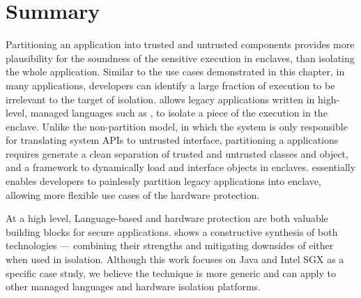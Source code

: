 \section{Summary}
\label{sec:civet:summary}

Partitioning an application into trusted and untrusted components
provides more plausibility for the soundness of the sensitive execution in enclaves,
than isolating the whole application.
Similar to the use cases demonstrated in this chapter,
in many applications,
developers can identify a large fraction of execution to be irrelevant to
the target of isolation.
\term{\sysname{}} allows legacy applications written in high-level,
managed languages such as \java{},
to isolate a piece of the execution in the \sgx{} enclave.
Unlike the non-partition model,
in which the system is only responsible for translating system APIs to untrusted interface,
partitioning a \java{} applications requires generate a clean separation
of trusted and untrusted classes and object,
and a framework to dynamically load and interface objects in enclaves.
\sysname{} essentially enables developers to painlessly partition legacy \java{} applications into enclave,
allowing more flexible use cases of the hardware protection.

At a high level,
Language-based and hardware protection are both valuable
building blocks for secure applications.
\sysname{} shows a constructive synthesis of both technologies
--- combining their strengths
and mitigating downsides of either when used in isolation.
Although this work focuses on Java and Intel SGX as a specific case study,
we believe the technique is more generic
and can apply to
other managed languages and hardware isolation platforms.




